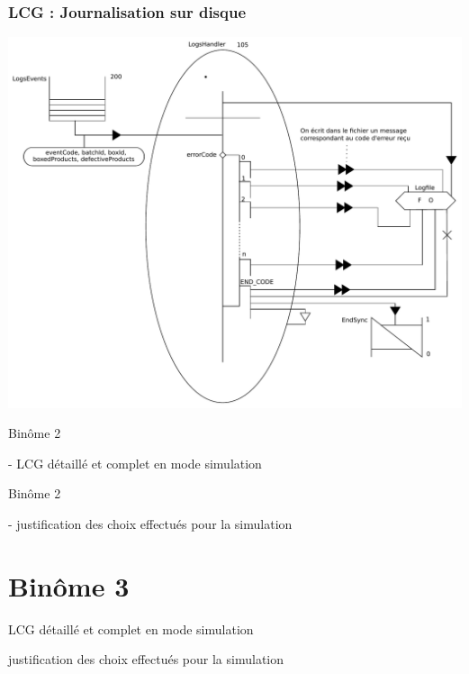 \documentclass{beamer}
\begin{document}
	\begin{frame}

	    \frametitle{LCG : Journalisation sur disque}

	    \includegraphics[width=\textwidth]{../SchemasLCG/LogsManager.pdf}

	\end{frame}

	

	\begin{frame}

	Binôme 2

	- LCG détaillé et complet en mode simulation

	\end{frame}

	

	\begin{frame}

	Binôme 2

	- justification des choix effectués pour la simulation  

	\end{frame}

\section{Binôme 3}
	\begin{frame}
		LCG détaillé et complet en mode simulation
	\end{frame}

	\begin{frame}
		justification des choix effectués pour la simulation 
	\end{frame}
\end{document}
